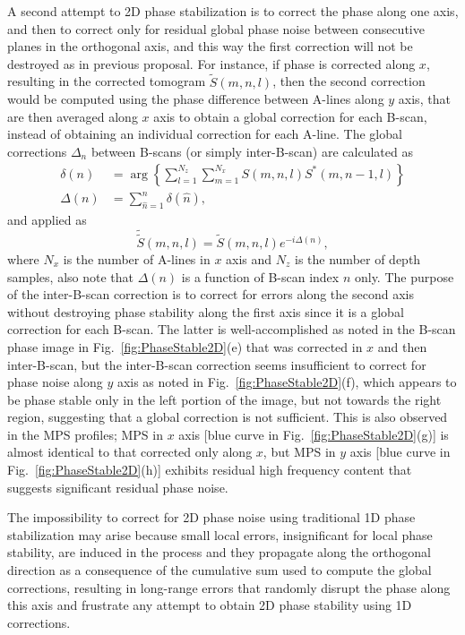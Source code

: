 A second attempt to 2D phase stabilization is to correct the phase along one axis, and then to correct only for residual global phase noise between consecutive planes in the orthogonal axis, and this way the first correction will not be destroyed as in previous proposal. For instance, if phase is corrected along $x$, resulting in the corrected tomogram $\tilde{S}(m,n,l)$, then the second correction would be computed using the phase difference between A-lines along $y$ axis, that are then averaged along $x$ axis to obtain a global correction for each B-scan, instead of obtaining an individual correction for each A-line. The global corrections $\Delta_n$ between B-scans (or simply inter-B-scan) are calculated as
\begin{align}
    \delta(n) &= \arg\left\{\sum_{l=1}^{N_z} \sum_{m=1}^{N_x} S(m,n,l) S^*(m,n-1,l)\right\} \nonumber\\
    \Delta(n) &= \sum_{\hat{n} = 1}^n\delta(\hat{n}),
\end{align}
and applied as
\begin{equation}
    \tilde{\tilde{S}}(m,n,l) = \tilde{S}(m,n,l) e^{-i\Delta(n)},
\end{equation}
where $N_x$ is the number of A-lines in $x$ axis and $N_z$ is the number of depth samples, also note that $\Delta(n)$ is a function of B-scan index $n$ only. The purpose of the inter-B-scan correction is to correct for errors along the second axis without destroying phase stability along the first axis since it is a global correction for each B-scan. The latter is well-accomplished as noted in the B-scan phase image in Fig.~\ref{fig:PhaseStable2D}(e) that was corrected in $x$ and then inter-B-scan, but the inter-B-scan correction seems insufficient to correct for phase noise along $y$ axis as noted in Fig.~\ref{fig:PhaseStable2D}(f), which appears to be phase stable only in the left portion of the image, but not towards the right region, suggesting that a global correction is not sufficient. This is also observed in the MPS profiles; MPS in $x$ axis [blue curve in Fig.~\ref{fig:PhaseStable2D}(g)] is almost identical to that corrected only along $x$, but MPS in $y$ axis [blue curve in Fig.~\ref{fig:PhaseStable2D}(h)] exhibits residual high frequency content that suggests significant residual phase noise.

The impossibility to correct for 2D phase noise using traditional 1D phase stabilization may arise because small local errors, insignificant for local phase stability, are induced in the process and they propagate along the orthogonal direction as a consequence of the cumulative sum used to compute the global corrections, resulting in long-range errors that randomly disrupt the phase along this axis and frustrate any attempt to obtain 2D phase stability using 1D corrections.

